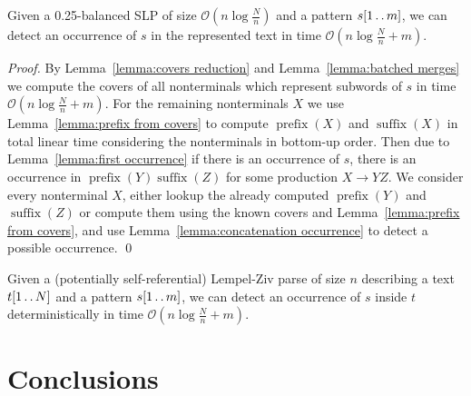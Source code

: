 \documentclass[runningheads]{llncs}
\DeclareMathOperator{\prefix}{prefix}
\DeclareMathOperator{\suffix}{suffix}
\newcommand{\twodots}{\mathinner{\ldotp\ldotp}}
\begin{document}
\begin{theorem}\label{theorem:balanced occurrence}
Given a 0.25-balanced SLP of size $\mathcal{O}(n\log\frac{N}{n})$ and a pattern $s[1\twodots m]$, we can detect an occurrence of $s$ in the represented text in time $\mathcal{O}(n\log\frac{N}{n}+m)$.
\end{theorem}

\begin{proof}
By Lemma~\ref{lemma:covers reduction} and Lemma~\ref{lemma:batched merges} we compute the covers of all nonterminals which represent subwords of $s$ in time $\mathcal{O}(n\log\frac{N}{n}+m)$. For the remaining nonterminals $X$ we use Lemma~\ref{lemma:prefix from covers} to compute $\prefix(X)$ and $\suffix(X)$ in total linear time considering the nonterminals in bottom-up order. Then due to Lemma~\ref{lemma:first occurrence} if there is an occurrence of $s$, there is an occurrence in $\prefix(Y)\suffix(Z)$ for some production $X\rightarrow YZ$. We consider every nonterminal $X$, either lookup the already computed $\prefix(Y)$ and $\suffix(Z)$ or compute them using the known covers and Lemma~\ref{lemma:prefix from covers}, and use Lemma~\ref{lemma:concatenation occurrence} to detect a possible occurrence.
\qed
\end{proof}



\begin{theorem}
Given a (potentially self-referential) Lempel-Ziv parse of size $n$ describing a text $t[1\twodots N]$ and a pattern $s[1\twodots m]$, we can detect an occurrence of $s$ inside $t$ deterministically in time $\mathcal{O}(n\log\frac{N}{n}+m)$.
\end{theorem}

\section{Conclusions}
\end{document}
